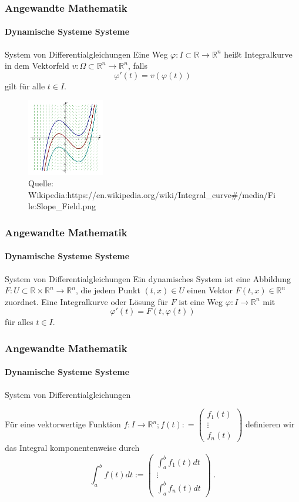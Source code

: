 \documentclass{beamer}
\begin{document}
\begin{frame}
    \frametitle{Angewandte Mathematik}
\framesubtitle{Dynamische Systeme Systeme}
\begin{block}{System von Differentialgleichungen}
Eine Weg $\varphi : I \subset \mathbb{R} \to \mathbb{R}^n$ heißt Integralkurve in dem Vektorfeld $v : \Omega \subset \mathbb{R}^n \to \mathbb{R}^n$, falls 
$$\varphi' (t) = v(\varphi(t))$$ gilt für alle $t \in  I$.
\end{block}
\begin{figure}[H]
      \centering
    \includegraphics[width=0.3\textwidth]{images/Slope_Field.png}
\caption{Quelle: Wikipedia:https://en.wikipedia.org/wiki/Integral\_curve\#/media/File:Slope\_Field.png}
\end{figure}

 \end{frame}


\begin{frame}
    \frametitle{Angewandte Mathematik}
\framesubtitle{Dynamische Systeme Systeme}
\begin{block}{System von Differentialgleichungen}
Ein dynamisches System ist eine  Abbildung $F : U \subset \mathbb{R} \times \mathbb{R}^n \to \mathbb{R}^n$, die jedem Punkt $(t,x)  \in U$ einen Vektor $F(t,x) \in \mathbb{R}^n$ zuordnet. Eine Integralkurve oder Lösung für $F$ ist eine Weg $\varphi : I \to \mathbb{R}^n$ mit 
$$\varphi'(t) = F(t, \varphi(t)) $$
für alles $t \in I$.
\end{block}
 \end{frame}


\begin{frame}
    \frametitle{Angewandte Mathematik}
\framesubtitle{Dynamische Systeme Systeme}
\begin{block}{System von Differentialgleichungen}

Für eine  vektorwertige Funktion  $f : I   \to \mathbb{R}^n; f(t) : = \begin{pmatrix} f_1(t)  \\ \vdots \\ f_n(t) \end{pmatrix}$ definieren wir das Integral komponentenweise durch
$$\int_{a}^{b}  f(t) dt := \begin{pmatrix} \int_{a}^{b}  f_1(t) dt  \\ \vdots \\ \int_{a}^{b}  f_n(t) dt \end{pmatrix} \; .$$
\end{block}
 \end{frame}
\end{document}
